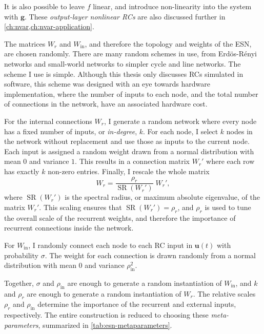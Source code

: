 It is also possible to leave $f$ linear, and introduce non-linearity
into the system with $\bm{g}$. These \emph{output-layer nonlinear RCs} are
also discussed further in \cref{ch:nvar,ch:nvar-application}.

The matrices $W_r$ and $W_\text{in}$, and therefore the topology and
weights of the ESN, are chosen randomly. There are many random schemes
in use, from Erd{\"{o}}s-R{\'{e}}nyi networks and small-world
networks\cite{haluszczynski2019} to simpler cycle and line
networks.\cite{rodan2011} The scheme I use is simple. Although this
thesis only discusses RCs simulated in software, this scheme was
designed with an eye towards hardware implementation, where the number
of inputs to each node, and the total number of connections in the
network, have an associated hardware cost.

For the internal connections $W_r$, I generate a random network where
every node has a fixed number of inputs, or \emph{in-degree}, $k$. For
each node, I select $k$ nodes in the network without replacement and
use those as inputs to the current node. Each input is assigned a
random weight drawn from a normal distribution with mean $0$ and
variance $1$. This results in a connection matrix $W_r'$ where each
row has exactly $k$ non-zero entries. Finally, I rescale the whole
matrix
\begin{equation}
  \label{eq:setradius}
  W_r = \frac{\rho_r}{\operatorname{SR}(W_r')}\;W_r',
\end{equation}
where $\operatorname{SR}(W_r')$ is the spectral radius, or maximum
absolute eigenvalue, of the matrix $W_r'$. This scaling ensures that
$\operatorname{SR}(W_r') = \rho_r$, and $\rho_r$ is used to tune the
overall scale of the recurrent weights, and therefore the importance
of recurrent connections inside the network.

For $W_\text{in}$, I randomly connect each node to each RC input in
$\bm{u}(t)$ with probability $\sigma$. The weight for each connection
is drawn randomly from a normal distribution with mean $0$ and
variance $\rho_\text{in}^2$.

Together, $\sigma$ and $\rho_\text{in}$ are enough to generate a
random instantiation of $W_\text{in}$, and $k$ and $\rho_r$ are enough
to generate a random instantiation of $W_r$. The relative scales
$\rho_r$ and $\rho_\text{in}$ determine the importance of the
recurrent and external inputs, respectively. The entire construction
is reduced to choosing these \emph{meta-parameters}, summarized in
\cref{tab:esn-metaparameters}.


